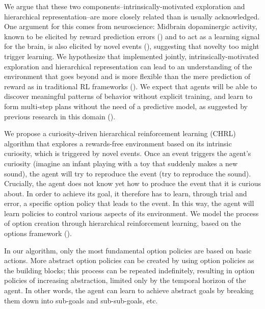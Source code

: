 \documentclass{article}
\begin{document}
We argue that these two components--intrinsically-motivated exploration and hierarchical representation--are more closely related than is usually acknowledged. One argument for this comes from neuroscience: Midbrain dopaminergic activity, known to be elicited by reward prediction errors (\cite{Schultz, schultz_neural_1997}) and to act as a learning signal for the brain, is also elicited by novel events (\cite{wittmann_striatal_2008}), suggesting that novelty too might trigger learning. We hypothesize that implemented jointly, intrinsically-motivated exploration and hierarchical representation can lead to an understanding of the environment that goes beyond and is more flexible than the mere prediction of reward as in traditional RL frameworks (\cite{sutton_reinforcement_2017}). We expect that agents will be able to discover meaningful patterns of behavior without explicit training, and learn to form multi-step plans without the need of a predictive model, as suggested by previous research in this domain (\cite{machado_learning_2016, chentanez_intrinsically_2005, pathak_curiosity-driven_2017, kulkarni_hierarchical_2016}).%

We propose a curiosity-driven hierarchical reinforcement learning (CHRL) algorithm that explores a rewards-free environment based on its intrinsic curiosity, which is triggered by novel events. Once an event triggers the agent's curiosity (imagine an infant playing with a toy that suddenly makes a new sound), the agent will try to reproduce the event (try to reproduce the sound). Crucially, the agent does not know yet how to produce the event that it is curious about. In order to achieve its goal, it therefore has to learn, through trial and error, a specific option policy that leads to the event. In this way, the agent will learn policies to control various aspects of its environment. We model the process of option creation through hierarchical reinforcement learning, based on the options framework (\cite{sutton_between_1999}).

In our algorithm, only the most fundamental option policies are based on basic actions. More abstract option policies can be created by using option policies as the building blocks; this process can be repeated indefinitely, resulting in option policies of increasing abstraction, limited only by the temporal horizon of the agent. In other words, the agent can learn to achieve abstract goals by breaking them down into sub-goals and sub-sub-goals, etc.
\end{document}
